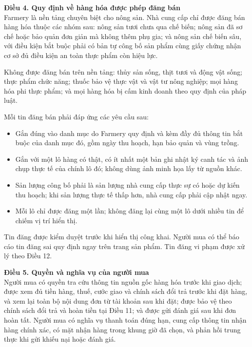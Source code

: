 \noindent\textbf{Điều 4. Quy định về hàng hóa được phép đăng bán}\\
Farmery là nền tảng chuyên biệt cho nông sản. Nhà cung cấp chỉ được đăng bán
hàng hóa thuộc các nhóm sau: nông sản tươi chưa qua chế biến; nông sản đã sơ
chế hoặc bảo quản đơn giản mà không thêm phụ gia; và nông sản chế biến sâu,
với điều kiện bắt buộc phải có bản tự công bố sản phẩm cùng giấy chứng nhận
cơ sở đủ điều kiện an toàn thực phẩm còn hiệu lực.

Không được đăng bán trên nền tảng: thủy sản sống, thịt tươi và động vật
sống; thực phẩm chức năng; thuốc bảo vệ thực vật và vật tư nông nghiệp; mọi
hàng hóa phi thực phẩm; và mọi hàng hóa bị cấm kinh doanh theo quy định của
pháp luật.

Mỗi tin đăng bán phải đáp ứng các yêu cầu sau:
\begin{itemize}
    \item Gắn đúng vào danh mục do Farmery quy định và kèm đầy đủ thông tin bắt
    buộc của danh mục đó, gồm ngày thu hoạch, hạn bảo quản và vùng trồng.
    \item Gắn với một lô hàng có thật, có ít nhất một bản ghi nhật ký canh tác
    và ảnh chụp thực tế của chính lô đó; không dùng ảnh minh họa lấy từ nguồn
    khác.
    \item Sản lượng công bố phải là sản lượng nhà cung cấp thực sự có hoặc dự
    kiến thu hoạch; khi sản lượng thực tế thấp hơn, nhà cung cấp phải cập nhật
    ngay.
    \item Mỗi lô chỉ được đăng một lần; không đăng lại cùng một lô dưới nhiều tin
    để chiếm vị trí hiển thị.
\end{itemize}
Tin đăng được kiểm duyệt trước khi hiển thị công khai. Người mua có thể báo
cáo tin đăng sai quy định ngay trên trang sản phẩm. Tin đăng vi phạm được xử
lý theo Điều 12.

\noindent\textbf{Điều 5. Quyền và nghĩa vụ của người mua}\\
Người mua có quyền tra cứu thông tin nguồn gốc hàng hóa trước khi giao dịch;
được xem đủ tiền hàng, thuế, cước giao và chính sách đổi trả trước khi đặt
hàng, và xem lại toàn bộ nội dung đơn từ tài khoản sau khi đặt; được bảo vệ
theo chính sách đổi trả và hoàn tiền tại Điều 11; và được gửi đánh giá sau
khi đơn hoàn tất. Người mua có nghĩa vụ thanh toán đúng hạn, cung cấp thông
tin nhận hàng chính xác, có mặt nhận hàng trong khung giờ đã chọn, và phản
hồi trung thực khi gửi khiếu nại hoặc đánh giá.

